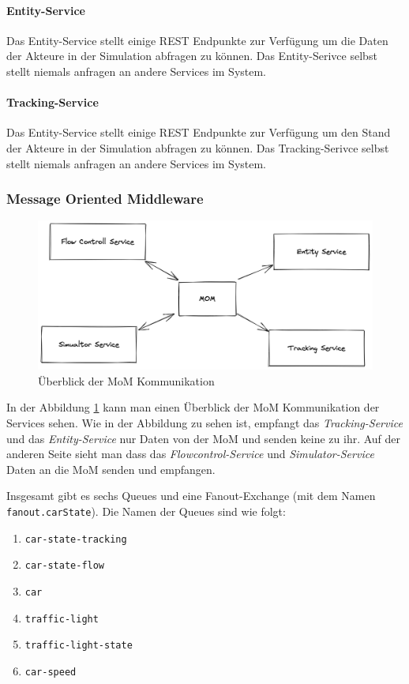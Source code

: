 \paragraph{Entity-Service}
Das Entity-Service stellt einige REST Endpunkte zur Verfügung um die Daten der Akteure in der Simulation abfragen zu können. Das Entity-Serivce selbst stellt niemals anfragen an andere Services im System.

\paragraph{Tracking-Service}
Das Entity-Service stellt einige REST Endpunkte zur Verfügung um den Stand der Akteure in der Simulation abfragen zu können. Das Tracking-Serivce selbst stellt niemals anfragen an andere Services im System.

\subsubsection{Message Oriented Middleware}

\begin{figure}[h]
	\centering
	\includegraphics[width=1.02\textwidth]{./figures/mom_communication.png}
	\caption{Überblick der MoM Kommunikation}
	\label{fig:kom_mom_overview}
\end{figure}

In der Abbildung \ref{fig:kom_mom_overview} kann man einen Überblick der MoM Kommunikation der Services sehen. Wie in der Abbildung zu sehen ist, empfangt das \textit{Tracking-Service} und das \textit{Entity-Service} nur Daten von der MoM und senden keine zu ihr. Auf der anderen Seite sieht man dass das \textit{Flowcontrol-Service} und \textit{Simulator-Service} Daten an die MoM senden und empfangen. 

Insgesamt gibt es sechs Queues und eine Fanout-Exchange (mit dem Namen \verb|fanout.carState|).
Die Namen der Queues sind wie folgt: 
\begin{enumerate}
	\item \verb|car-state-tracking| 
	\item \verb|car-state-flow| 
	\item \verb|car| 
	\item \verb|traffic-light| 
	\item \verb|traffic-light-state| 
	\item \verb|car-speed| 
\end{enumerate}

